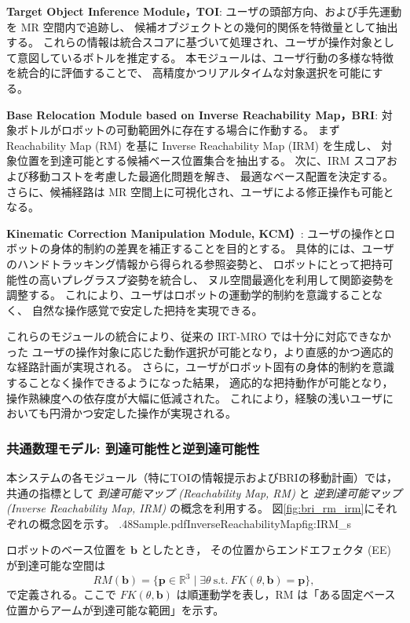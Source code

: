 \documentclass[../../main.tex]{subfiles} %
\begin{document}
\noindent
\textbf{Target Object Inference Module，TOI}: 
ユーザの頭部方向、および手先運動を MR 空間内で追跡し、
候補オブジェクトとの幾何的関係を特徴量として抽出する。
これらの情報は統合スコアに基づいて処理され、ユーザが操作対象として意図しているボトルを推定する。
本モジュールは、ユーザ行動の多様な特徴を統合的に評価することで、
高精度かつリアルタイムな対象選択を可能にする。

\medskip
\noindent
\textbf{Base Relocation Module based on Inverse Reachability Map，BRI}: 
対象ボトルがロボットの可動範囲外に存在する場合に作動する。
まず Reachability Map (RM) を基に Inverse Reachability Map (IRM) を生成し\cite{RM}、
対象位置を到達可能とする候補ベース位置集合を抽出する。
次に、IRM スコアおよび移動コストを考慮した最適化問題を解き、
最適なベース配置を決定する。
さらに、候補経路は MR 空間上に可視化され、ユーザによる修正操作も可能となる。

\medskip
\noindent
\textbf{Kinematic Correction Manipulation Module, KCM）}: 
ユーザの操作とロボットの身体的制約の差異を補正することを目的とする。
具体的には、ユーザのハンドトラッキング情報から得られる参照姿勢と、
ロボットにとって把持可能性の高いプレグラスプ姿勢を統合し、
ヌル空間最適化を利用して関節姿勢を調整する。
これにより、ユーザはロボットの運動学的制約を意識することなく、
自然な操作感覚で安定した把持を実現できる。

\medskip
これらのモジュールの統合により、従来の IRT-MRO では十分に対応できなかった
ユーザの操作対象に応じた動作選択が可能となり，より直感的かつ適応的な経路計画が実現される。
さらに，ユーザがロボット固有の身体的制約を意識することなく操作できるようになった結果，
適応的な把持動作が可能となり，操作熟練度への依存度が大幅に低減された。
これにより，経験の浅いユーザにおいても円滑かつ安定した操作が実現される。

\subsubsection*{共通数理モデル: 到達可能性と逆到達可能性}
本システムの各モジュール（特にTOIの情報提示およびBRIの移動計画）では，
共通の指標として
\textit{到達可能マップ (Reachability Map, RM)} と
\textit{逆到達可能マップ (Inverse Reachability Map, IRM)} の概念を利用する\cite{RM}。
図\ref{fig:bri_rm_irm}にそれぞれの概念図を示す。
{.48\linewidth}{Sample.pdf}{InverseReachabilityMap}{fig:IRM_s}
\label{fig:bri_rm_irm}

ロボットのベース位置を $\mathbf{b}$ としたとき，
その位置からエンドエフェクタ (EE) が到達可能な空間は
\begin{equation}
RM(\mathbf{b}) = \{ \mathbf{p} \in \mathbb{R}^3 \mid \exists \theta \ \text{s.t.} \ FK(\theta, \mathbf{b}) = \mathbf{p} \},
\end{equation}
で定義される。ここで $FK(\theta,\mathbf{b})$ は順運動学を表し，RM は「ある固定ベース位置からアームが到達可能な範囲」を示す。
\end{document}
